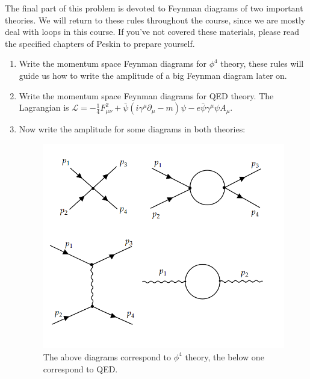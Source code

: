 \documentclass[11pt]{article}
\begin{document}
\begin{enumerate}
	\noindent
	The final part of this problem is devoted to Feynman diagrams of two important theories. We will return to these rules throughout the course, since we are mostly deal with loops in this course. If you've not covered these materials, please read the specified chapters of Peskin to prepare yourself.
	\begin{enumerate}
		\item Write the momentum space Feynman diagrams for $\phi^4$ theory, these rules will guide us how to write the amplitude of a big Feynman diagram later on.
		\item Write the momentum space Feynman diagrams for QED theory. The Lagrangian is $\mathscr{L} = -\frac14 F_{\mu\nu}^2 +\bar{\psi}(i\gamma^\mu \partial_\mu -m)\psi -e\bar{\psi} \gamma^\mu \psi A_\mu$.
		\item Now write the amplitude for some diagrams in both theories:
			\begin{figure}[H]
				\centering
				\includegraphics[width=0.7\linewidth]{img/diag.png}
				\caption{The above diagrams correspond to $\phi^4$ theory, the below one correspond to QED.}
			\end{figure}
	\end{enumerate}
\end{enumerate}



\newpage
\end{document}
